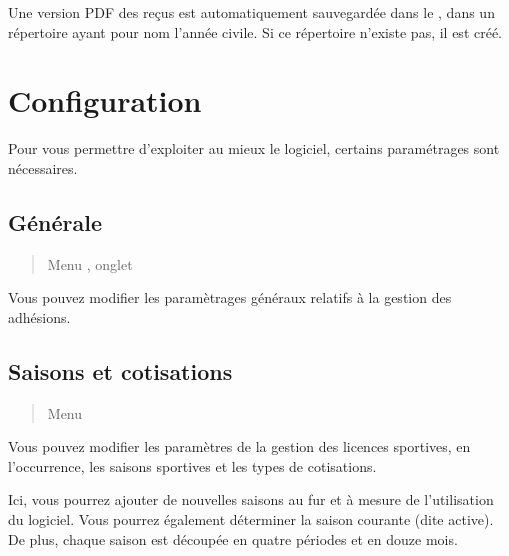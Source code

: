 \documentclass[a4paper,10pt,oneside,french]{sphinxmanual}
\begin{document}
 Une version PDF des reçus est automatiquement sauvegardée dans le , dans un répertoire ayant pour nom l’année civile. Si ce répertoire n’existe pas, il est créé.


\section{Configuration}
\label{\detokenize{member/config:configuration}}\label{\detokenize{member/config::doc}}
Pour vous permettre d’exploiter au mieux le logiciel, certains paramétrages sont nécessaires.


\subsection{Générale}
\label{\detokenize{member/config:generale}}\begin{quote}

Menu , onglet 
\end{quote}

Vous pouvez modifier les paramètrages généraux relatifs à la gestion des adhésions.
\begin{quote}

\noindent{}
\end{quote}


\subsection{Saisons et cotisations}
\label{\detokenize{member/config:saisons-et-cotisations}}\begin{quote}

Menu 
\end{quote}

Vous pouvez modifier les paramètres de la gestion des licences sportives, en l’occurrence, les saisons sportives et les types de cotisations.

\begin{quote}

\noindent{}
\end{quote}

Ici, vous pourrez ajouter de nouvelles saisons au fur et à mesure de l’utilisation du logiciel. Vous pourrez également déterminer la saison courante (dite active).
De plus, chaque saison est découpée en quatre périodes et en douze mois.
\end{document}

